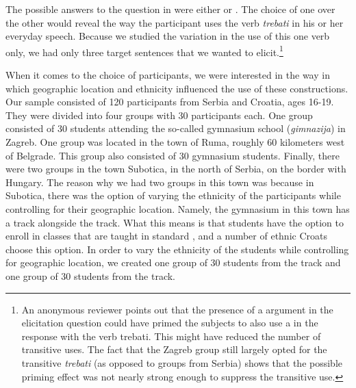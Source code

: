 \documentclass[output=paper,modfonts,newtxmath,hidelinks,]{langscibook}
\begin{document}
\ea \label{7:ex7}
	\z
\z

\noindent The possible answers to the question in  were either  or . The choice of one over the other would reveal the way the participant uses the verb \textit{trebati} in his or her everyday speech. Because we studied the variation in the use of this one verb only, we had only three target sentences that we wanted to elicit.\footnote{\label{7:fn2}An anonymous reviewer points out that the presence of a  argument in the elicitation question could have primed the subjects to also use a  in the response with the verb trebati. This might have reduced the number of transitive uses. The fact that the Zagreb group still largely opted for the transitive \textit{trebati} (as opposed to groups from Serbia) shows that the possible priming effect was not nearly strong enough to suppress the transitive use.}

When it comes to the choice of participants, we were interested in the way in which geographic location and ethnicity influenced the use of these constructions. Our sample consisted of 120 participants from Serbia and Croatia, ages 16-19. They were divided into four groups with 30 participants each. One group consisted of 30 students attending the so-called gymnasium school (\textit{gimnazija}) in Zagreb. One group was located in the town of Ruma, roughly 60 kilometers west of Belgrade. This group also consisted of 30 gymnasium students. Finally, there were two groups in the town Subotica, in the north of Serbia, on the border with Hungary. The reason why we had two groups in this town was because in Subotica, there was the option of varying the ethnicity of the participants while controlling for their geographic location. Namely, the gymnasium in this town has a  track alongside the  track. What this means is that students have the option to enroll in classes that are taught in standard , and a number of ethnic Croats choose this option. In order to vary the ethnicity of the students while controlling for geographic location, we created one group of 30 students from the  track and one group of 30 students from the  track. 
\end{document}
